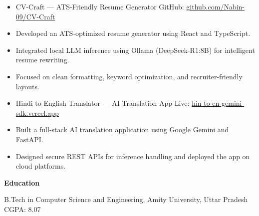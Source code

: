 \documentclass[12pt]{article}
\begin{document}
\begin{itemize}[noitemsep,topsep=0pt]
\item CV-Craft — ATS-Friendly Resume Generator
GitHub: \href{https://github.com/Nabin-09/CV-Craft}{github.com/Nabin-09/CV-Craft}
\item Developed an ATS-optimized resume generator using React and TypeScript.
\item Integrated local LLM inference using Ollama (DeepSeek-R1:8B) for intelligent resume rewriting.
\item Focused on clean formatting, keyword optimization, and recruiter-friendly layouts.
\end{itemize}

\begin{itemize}[noitemsep,topsep=0pt]
\item Hindi to English Translator — AI Translation App
Live: \href{https://hin-to-en-gemini-sdk.vercel.app}{hin-to-en-gemini-sdk.vercel.app}
\item Built a full-stack AI translation application using Google Gemini and FastAPI.
\item Designed secure REST APIs for inference handling and deployed the app on cloud platforms.
\end{itemize}

\textbf{Education}

B.Tech in Computer Science and Engineering, Amity University, Uttar Pradesh CGPA: 8.07
\end{document}
